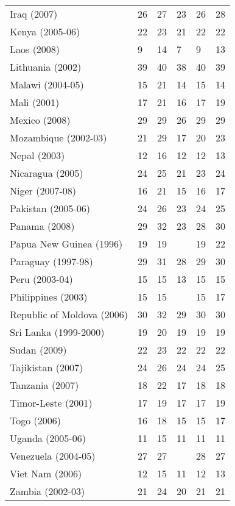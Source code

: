 \begin{tabular}{L{2.0cm} R{0.7cm} R{0.7cm} R{0.7cm} R{0.7cm} R{0.7cm}}
        Iraq (2007) & 26 & 27 & 23 & 26 & 28 \\
        Kenya (2005-06) & 22 & 23 & 21 & 22 & 22 \\
        Laos (2008) & 9 & 14 & 7 & 9 & 13 \\
        Lithuania (2002) & 39 & 40 & 38 & 40 & 39 \\
        Malawi (2004-05) & 15 & 21 & 14 & 15 & 14 \\
        Mali (2001) & 17 & 21 & 16 & 17 & 19 \\
        Mexico (2008) & 29 & 29 & 26 & 29 & 29 \\
        Mozambique (2002-03) & 21 & 29 & 17 & 20 & 23 \\
        Nepal (2003) & 12 & 16 & 12 & 12 & 13 \\
        Nicaragua (2005) & 24 & 25 & 21 & 23 & 24 \\
        Niger (2007-08) & 16 & 21 & 15 & 16 & 17 \\
        Pakistan (2005-06) & 24 & 26 & 23 & 24 & 25 \\
        Panama (2008) & 29 & 32 & 23 & 28 & 30 \\
        Papua New Guinea (1996) & 19 & 19 &  & 19 & 22 \\
        Paraguay (1997-98) & 29 & 31 & 28 & 29 & 30 \\
        Peru (2003-04) & 15 & 15 & 13 & 15 & 15 \\
        Philippines (2003) & 15 & 15 &  & 15 & 17 \\
        Republic of Moldova (2006) & 30 & 32 & 29 & 30 & 30 \\
        Sri Lanka (1999-2000) & 19 & 20 & 19 & 19 & 19 \\
        Sudan (2009) & 22 & 23 & 22 & 22 & 22 \\
        Tajikistan (2007) & 24 & 26 & 24 & 24 & 25 \\
        Tanzania (2007) & 18 & 22 & 17 & 18 & 18 \\
        Timor-Leste (2001) & 17 & 19 & 17 & 17 & 19 \\
        Togo (2006) & 16 & 18 & 15 & 15 & 17 \\
        Uganda (2005-06) & 11 & 15 & 11 & 11 & 11 \\
        Venezuela (2004-05) & 27 & 27 &  & 28 & 27 \\
        Viet Nam (2006) & 12 & 15 & 11 & 12 & 13 \\
        Zambia (2002-03) & 21 & 24 & 20 & 21 & 21 \\
       \toprule
      \end{tabular}
\clearpage

